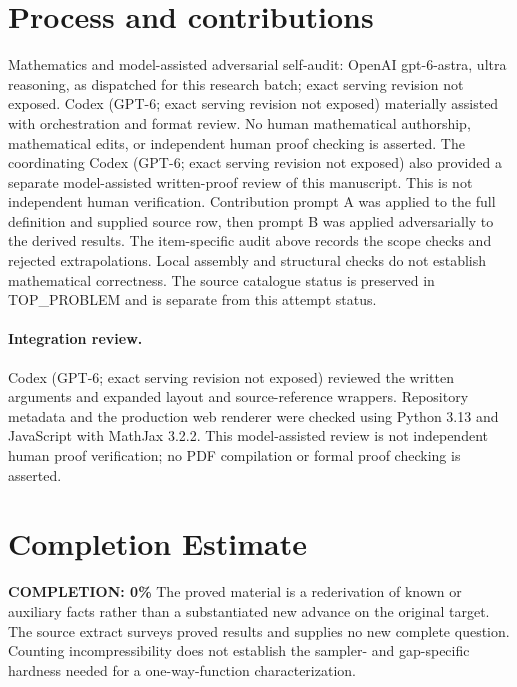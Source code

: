\documentclass[11pt]{article}
\begin{document}
\section{Process and contributions}
Mathematics and model-assisted adversarial self-audit: OpenAI gpt-6-astra, ultra reasoning, as dispatched for this research batch; exact serving revision not exposed. Codex (GPT-6; exact serving revision not exposed) materially assisted with orchestration and format review. No human mathematical authorship, mathematical edits, or independent human proof checking is asserted.
The coordinating Codex (GPT-6; exact serving revision not exposed) also provided a separate model-assisted written-proof review of this manuscript. This is not independent human verification.
Contribution prompt A was applied to the full definition and supplied source row, then prompt B was applied adversarially to the derived results. The item-specific audit above records the scope checks and rejected extrapolations. Local assembly and structural checks do not establish mathematical correctness. The source catalogue status is preserved in TOP\_PROBLEM and is separate from this attempt status.
\paragraph{Integration review.} Codex (GPT-6; exact serving revision not exposed) reviewed the written arguments and expanded layout and source-reference wrappers. Repository metadata and the production web renderer were checked using Python 3.13 and JavaScript with MathJax 3.2.2. This model-assisted review is not independent human proof verification; no PDF compilation or formal proof checking is asserted.

\section{Completion Estimate}
\noindent\textbf{COMPLETION: 0\%}
The proved material is a rederivation of known or auxiliary facts rather than a substantiated new advance on the original target. The source extract surveys proved results and supplies no new complete question. Counting incompressibility does not establish the sampler- and gap-specific hardness needed for a one-way-function characterization.
\end{document}
